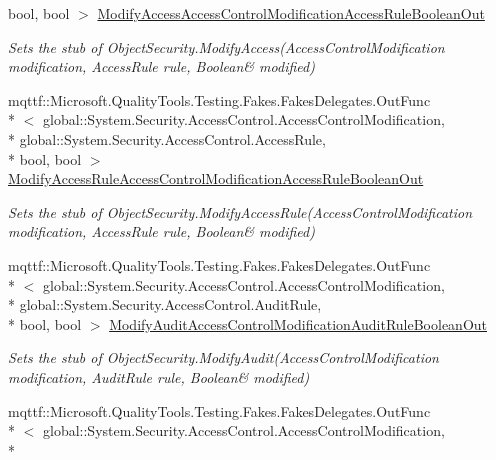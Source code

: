 \begin{DoxyCompactItemize}
bool, bool $>$ \hyperlink{class_system_1_1_security_1_1_access_control_1_1_fakes_1_1_stub_object_security_ab81362fd347ce5103e2c463ea48ebd52}{Modify\-Access\-Access\-Control\-Modification\-Access\-Rule\-Boolean\-Out}
\begin{DoxyCompactList}\small\item\em Sets the stub of Object\-Security.\-Modify\-Access(Access\-Control\-Modification modification, Access\-Rule rule, Boolean\& modified)\end{DoxyCompactList}\item 
mqttf\-::\-Microsoft.\-Quality\-Tools.\-Testing.\-Fakes.\-Fakes\-Delegates.\-Out\-Func\\*
$<$ global\-::\-System.\-Security.\-Access\-Control.\-Access\-Control\-Modification, \\*
global\-::\-System.\-Security.\-Access\-Control.\-Access\-Rule, \\*
bool, bool $>$ \hyperlink{class_system_1_1_security_1_1_access_control_1_1_fakes_1_1_stub_object_security_a81826f0685be009a8dfa1c48cef46e6e}{Modify\-Access\-Rule\-Access\-Control\-Modification\-Access\-Rule\-Boolean\-Out}
\begin{DoxyCompactList}\small\item\em Sets the stub of Object\-Security.\-Modify\-Access\-Rule(Access\-Control\-Modification modification, Access\-Rule rule, Boolean\& modified)\end{DoxyCompactList}\item 
mqttf\-::\-Microsoft.\-Quality\-Tools.\-Testing.\-Fakes.\-Fakes\-Delegates.\-Out\-Func\\*
$<$ global\-::\-System.\-Security.\-Access\-Control.\-Access\-Control\-Modification, \\*
global\-::\-System.\-Security.\-Access\-Control.\-Audit\-Rule, \\*
bool, bool $>$ \hyperlink{class_system_1_1_security_1_1_access_control_1_1_fakes_1_1_stub_object_security_ad9b67f61a7a565e74eb62dd19bfe96af}{Modify\-Audit\-Access\-Control\-Modification\-Audit\-Rule\-Boolean\-Out}
\begin{DoxyCompactList}\small\item\em Sets the stub of Object\-Security.\-Modify\-Audit(Access\-Control\-Modification modification, Audit\-Rule rule, Boolean\& modified)\end{DoxyCompactList}\item 
mqttf\-::\-Microsoft.\-Quality\-Tools.\-Testing.\-Fakes.\-Fakes\-Delegates.\-Out\-Func\\*
$<$ global\-::\-System.\-Security.\-Access\-Control.\-Access\-Control\-Modification, \\*

\end{DoxyCompactItemize}
